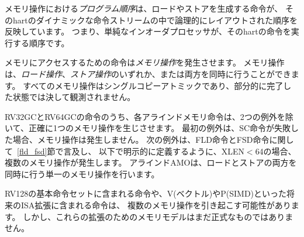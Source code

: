 \label{sec:rvwmo:primitives}
\begin{comment}
The {\em program order} over memory operations reflects the order in which the instructions that generate each load and store are logically laid out in that hart's dynamic instruction stream; i.e., the order in which a simple in-order processor would execute the instructions of that hart.
\end{comment}

メモリ操作における{\em プログラム順序}は、ロードやストアを生成する命令が、
そのhartのダイナミックな命令ストリームの中で論理的にレイアウトされた順序を反映しています。
つまり、単純なインオーダプロセッサが、そのhartの命令を実行する順序です。

\begin{comment}
Memory-accessing instructions give rise to {\em memory operations}.
A memory operation can be either a {\em load operation}, a {\em store operation}, or both simultaneously.
All memory operations are single-copy atomic: they can never be observed in a partially-complete state.
\end{comment}

メモリにアクセスするための命令は{\em メモリ操作}を発生させます。
メモリ操作は、{\em ロード操作}、{\em ストア操作}のいずれか、または両方を同時に行うことができます。
すべてのメモリ操作はシングルコピーアトミックであり、部分的に完了した状態では決して観測されません。

\begin{comment}
Among instructions in RV32GC and RV64GC, each aligned memory instruction gives rise to exactly one memory operation, with two exceptions.
First, an unsuccessful SC instruction does not give rise to any memory operations.
Second, FLD and FSD instructions may each give rise to multiple memory operations if XLEN$<$64, as stated in Section~\ref{fld_fsd} and clarified below.
An aligned AMO gives rise to a single memory operation that is both a load operation and a store operation simultaneously.
\end{comment}

RV32GCとRV64GCの命令のうち、各アラインドメモリ命令は、2つの例外を除いて、正確に1つのメモリ操作を生じさせます。
最初の例外は、SC命令が失敗した場合、メモリ操作は発生しません。
次の例外は、FLD命令とFSD命令に関して~\ref{fld_fsd}節で言及し、
以下で明示的に定義するように、XLEN$<$64の場合、複数のメモリ操作が発生します。
アラインドAMOは、ロードとストアの両方を同時に行う単一のメモリ操作を行います。

\begin{commentary}
\begin{comment}
  Instructions in the RV128 base instruction set and in future ISA extensions such as V (vector) and P (SIMD) may give rise to multiple memory operations.  However, the memory model for these extensions has not yet been formalized.
\end{comment}
  RV128の基本命令セットに含まれる命令や、V(ベクトル)やP(SIMD)といった将来のISA拡張に含まれる命令は、
複数のメモリ操作を引き起こす可能性があります。 
しかし、これらの拡張のためのメモリモデルはまだ正式なものではありません。
\end{commentary}

